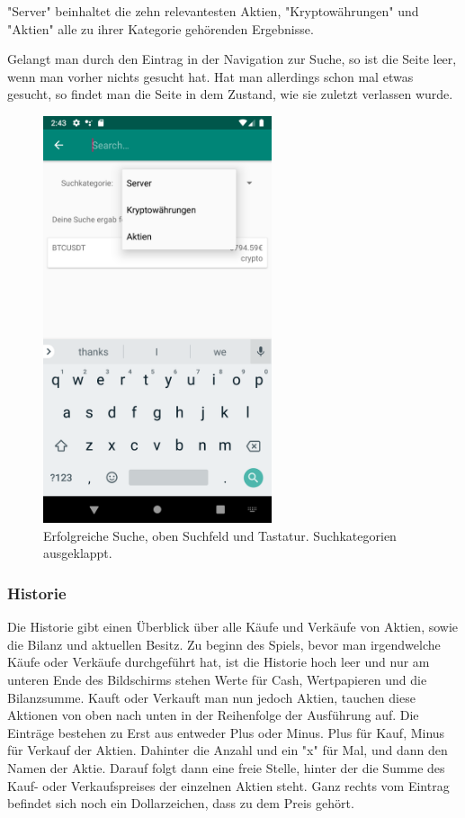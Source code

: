 \documentclass[10pt]{scrartcl}
\begin{document}
"Server" beinhaltet die zehn relevantesten Aktien, "Kryptowährungen" und "Aktien" alle zu ihrer Kategorie gehörenden Ergebnisse.

Gelangt man durch den Eintrag in der Navigation zur Suche, so ist die Seite leer, wenn man vorher nichts gesucht hat. Hat man allerdings schon mal etwas gesucht, so findet man die Seite in dem Zustand, wie sie zuletzt verlassen wurde.

\begin{figure}[H]
	\centering
	\includegraphics[width=0.6\textwidth]{Bilder/Applikation/Suche.png}
	\caption{Erfolgreiche Suche, oben Suchfeld und Tastatur. Suchkategorien ausgeklappt.}
\end{figure}

\subsubsection{Historie}

Die Historie gibt einen Überblick über alle Käufe und Verkäufe von Aktien, sowie die Bilanz und aktuellen Besitz. Zu beginn des Spiels, bevor man irgendwelche Käufe oder Verkäufe durchgeführt hat, ist die Historie hoch leer und nur am unteren Ende des Bildschirms stehen Werte für Cash, Wertpapieren und die Bilanzsumme. Kauft oder Verkauft man nun jedoch Aktien, tauchen diese Aktionen von oben nach unten in der Reihenfolge der Ausführung auf. Die Einträge bestehen zu Erst aus entweder Plus oder Minus. Plus für Kauf, Minus für Verkauf der Aktien. Dahinter die Anzahl und ein "x" für Mal, und dann den Namen der Aktie. Darauf folgt dann eine freie Stelle, hinter der die Summe des Kauf- oder Verkaufspreises der einzelnen Aktien steht. Ganz rechts vom Eintrag befindet sich noch ein Dollarzeichen, dass zu dem Preis gehört.
\end{document}
